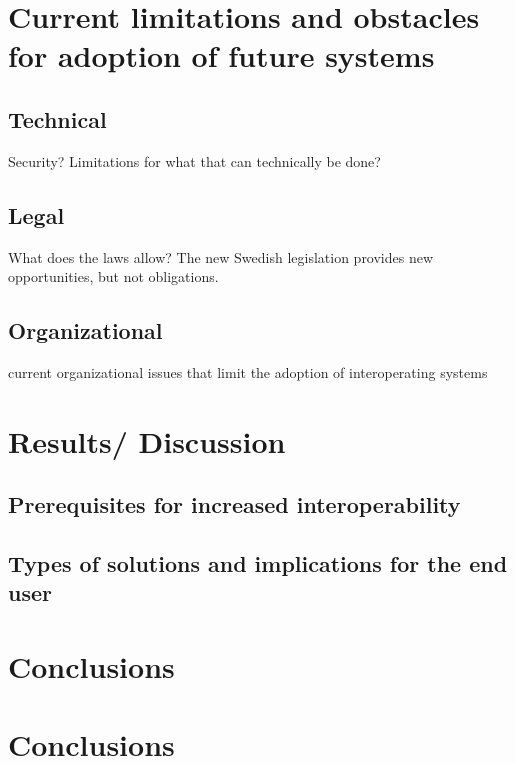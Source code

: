 \documentclass[12pt]{article}
\begin{document}
\section{Current limitations and obstacles for adoption of future systems}

\subsection{Technical}
Security? Limitations for what that can technically be done?

\subsection{Legal}
What does the laws allow? The new Swedish legislation provides new opportunities, but not obligations. %

\subsection{Organizational}
current organizational issues that limit the adoption of interoperating systems

\section{Results/ Discussion}

\subsection{ Prerequisites for increased interoperability}

\subsection{Types of solutions and implications for the end user}

\section{Conclusions}

\section{Conclusions}

\newpage
\begin{appendix}


\end{appendix}

\newpage
 
 
\end{document}
